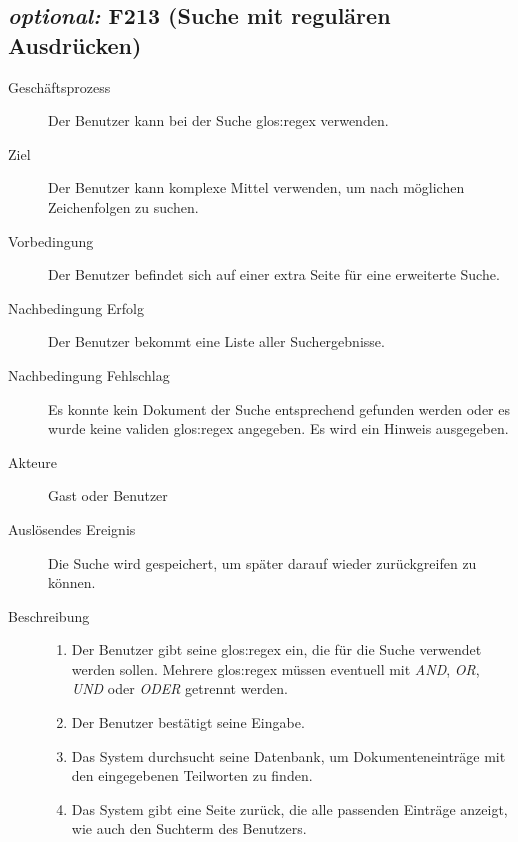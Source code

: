 \subsection{\emph{optional:} F213 (Suche mit regulären Ausdrücken)}
\label{F:regexSuche}
\begin{description}
  \item[Geschäftsprozess]Der Benutzer kann bei der Suche \gls{glos:regex}  verwenden.
  \item[Ziel]Der Benutzer kann komplexe Mittel verwenden, um nach möglichen Zeichenfolgen zu suchen.
  \item[Vorbedingung]Der Benutzer befindet sich auf einer extra Seite für eine erweiterte Suche.
  \item[Nachbedingung Erfolg]Der Benutzer bekommt eine Liste aller Suchergebnisse.
  \item[Nachbedingung Fehlschlag]Es konnte kein Dokument der Suche entsprechend gefunden werden oder es wurde keine validen \gls{glos:regex} angegeben. Es wird ein Hinweis ausgegeben.
  \item[Akteure]Gast oder Benutzer
  \item[Auslösendes Ereignis]Die Suche wird gespeichert, um später darauf wieder zurückgreifen zu können.
  \item[Beschreibung]\hfill
    \begin{enumerate}
      \item Der Benutzer gibt seine \gls{glos:regex} ein, die für die Suche verwendet werden sollen. Mehrere \gls{glos:regex} müssen eventuell mit \emph{AND}, \emph{OR}, \emph{UND} oder \emph{ODER} getrennt werden.
      \item Der Benutzer bestätigt seine Eingabe.
      \item Das System durchsucht seine Datenbank, um Dokumenteneinträge mit den eingegebenen Teilworten zu finden.
      \item Das System gibt eine Seite zurück, die alle passenden Einträge anzeigt, wie auch den Suchterm des Benutzers.
    \end{enumerate}
\end{description}

